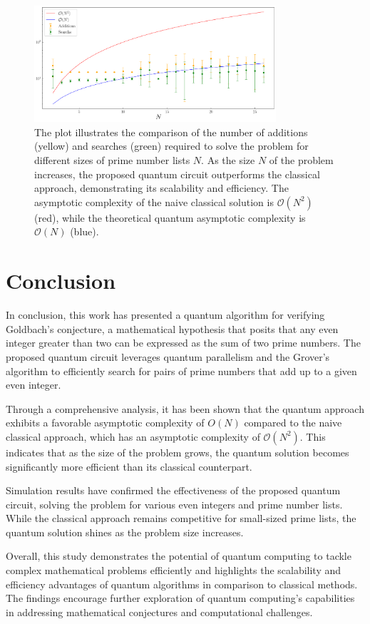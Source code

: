 \documentclass[aps,prapplied,longbibliography]{article}
\begin{document}
    \begin{figure}[H]
        \centering
        \includegraphics[width=0.8\textwidth]{../Results/Results.pdf}
        \caption{The plot illustrates the comparison of the number of additions (yellow) and searches (green) required to solve the problem for different sizes of prime number lists $N$. As the size $N$ of the problem increases, the proposed quantum circuit outperforms the classical approach, demonstrating its scalability and efficiency. The asymptotic complexity of the naive classical solution is $\mathcal{O}(N^2)$ (red), while the theoretical quantum asymptotic complexity is $\mathcal{O}(N)$ (blue).}
        \label{fig:Results}
    \end{figure}

    \section{Conclusion}

    In conclusion, this work has presented a quantum algorithm for verifying Goldbach's conjecture, a mathematical hypothesis that posits that any even integer greater than two can be expressed as the sum of two prime numbers. The proposed quantum circuit leverages quantum parallelism and the Grover's algorithm to efficiently search for pairs of prime numbers that add up to a given even integer.

    Through a comprehensive analysis, it has been shown that the quantum approach exhibits a favorable asymptotic complexity of $O(N)$ compared to the naive classical approach, which has an asymptotic complexity of $\mathcal{O}(N^2)$. This indicates that as the size of the problem grows, the quantum solution becomes significantly more efficient than its classical counterpart.

    Simulation results have confirmed the effectiveness of the proposed quantum circuit, solving the problem for various even integers and prime number lists. While the classical approach remains competitive for small-sized prime lists, the quantum solution shines as the problem size increases.

    Overall, this study demonstrates the potential of quantum computing to tackle complex mathematical problems efficiently and highlights the scalability and efficiency advantages of quantum algorithms in comparison to classical methods. The findings encourage further exploration of quantum computing's capabilities in addressing mathematical conjectures and computational challenges.


    \nocite{*}
    
    
\end{document}
